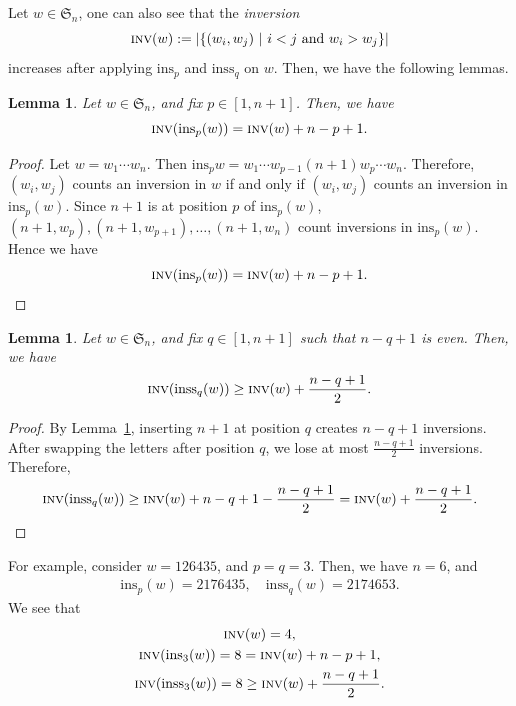 \documentclass[12pt]{amsart}
\newtheorem{lem}[thm]{Lemma}
\theoremstyle{definition}
\numberwithin{equation}{section}
\newcommand{\sn}{\mathfrak{S}_n}
\newcommand{\inv}{\textsc{inv}}
\newcommand{\defeq}{:=}
\newcommand{\ins}[1]{\mathrm{ins}_{#1}}
\newcommand{\inss}[1]{\mathrm{inss}_{#1}}
\begin{document}
Let $w\in \sn$, one can also see that the \emph{inversion}
\begin{equation}\label{eq:invdef}
\inv (w) \defeq |\{(w_i,w_j) \ | \ i < j \text{ and } w_i > w_j \}|
\end{equation} increases after applying $\ins p $ and $\inss q$ on $w$. Then, we have the following lemmas.

\begin{lem}\label{l:ins inv}
    Let $w \in \sn$, and fix $p \in [1,n+1]$. Then, we have \begin{equation*}\inv (\ins p (w)) = \inv(w) + n-p+1.\end{equation*}
\end{lem}
\begin{proof}
    Let $w = w_1\cdots w_n$. Then $\ins p w = w_1\cdots w_{p-1}(n+1)w_{p}\cdots w_n$. Therefore, $(w_i,w_j)$ counts an inversion in $w$ if and only if $(w_i,w_j)$ counts an inversion in $\ins p (w)$. Since $n+1$ is at position $p$ of $\ins p (w)$, $(n+1, w_p), (n+1, w_{p+1}) , \dotsc , (n+1, w_n)$ count inversions in $\ins p (w)$. Hence we have \begin{equation*}
        \inv (\ins p (w)) = \inv(w) + n-p+1.
    \end{equation*}
\end{proof}

\begin{lem}\label{l:inss inv}
    Let $w\in \sn$, and fix $q \in [1,n+1]$ such that $n-q+1$ is even. Then, we have
    \begin{equation*}
        \inv (\inss{q} (w)) \geq \inv (w) + \frac{n-q+1}{2}.
    \end{equation*}
\end{lem}
\begin{proof}
    By Lemma~\ref{l:ins inv}, inserting $n+1$ at position $q$ creates $n-q+1$ inversions. After swapping the letters after position $q$, we lose at most $\tfrac{n-q+1}{2}$ inversions. Therefore, \begin{equation*}
        \inv (\inss{q} (w)) \geq \inv (w) + n-q+1 - \frac{n-q+1}{2} = \inv (w) + \frac{n-q+1}{2}.
    \end{equation*}\end{proof}

For example, consider $w = 126435$, and $p=q=3$. Then, we have $n=6$, and \begin{gather*}
    \ins p (w) = 2176435, \quad \inss q (w) = 2174653.
\end{gather*}We see that
    \begin{gather*}
        \inv (w) = 4, \\
        \inv (\ins 3 (w)) = 8 = \inv (w) + n -p +1, \\
        \inv (\inss 3 (w)) = 8 \geq \inv (w) + \frac{n-q+1}{2}.
\end{gather*}
\end{document}
